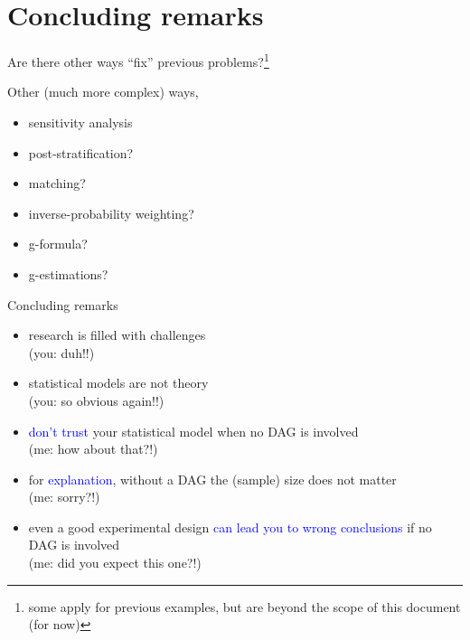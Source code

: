 \section{Concluding remarks}
%
\begin{frame}[negative]
	\sectionpage
\end{frame}
%
%
\begin{frame}
	{Are there other ways ``fix'' previous problems?\footnote{some apply for previous examples, but are beyond the scope of this document (for now)}}
	
	Other (much more complex) ways,
	\begin{itemize}
		\item sensitivity analysis \\
		\item post-stratification? \\
		\item matching?
		\item inverse-probability weighting?
		\item g-formula?
		\item g-estimations?
	\end{itemize}
\end{frame}
%
%
\begin{lhframe}[rhgraphic={\texttt{[image: think1.jpg]}}]
	{Concluding remarks}
	
	\begin{itemize}
		\item research is filled with challenges \\
		{\small (you: duh!!) }
		\item statistical models are not theory \\
		{\small (you: so obvious again!!) }
		\item \textcolor{blue}{don't trust} your statistical model when no DAG is involved \\
		{\small (me: how about that?!) }
		\item for \textcolor{blue}{explanation}, without a DAG the (sample) size does not matter \\
		{\small (me: sorry?!) }
		\item even a good experimental design \textcolor{blue}{can lead you to wrong conclusions} if no DAG is involved \\
		{\small (me: did you expect this one?!)}
	\end{itemize} 
\end{lhframe}
